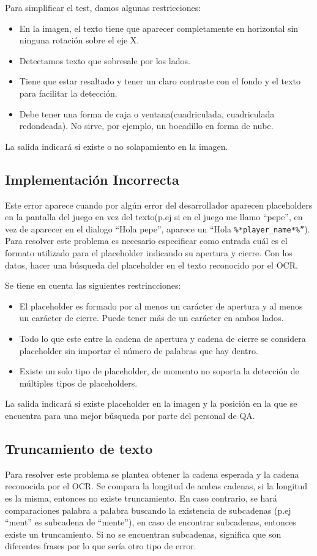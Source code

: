Para simplificar el test, damos algunas restricciones: 
\begin{itemize}
	\item En la imagen, el texto tiene que aparecer completamente en horizontal sin ninguna rotación sobre el eje X.
	\item Detectamos texto que sobresale por los lados.
	\item Tiene que estar resaltado y tener un claro contraste con el fondo y el texto para facilitar la detección.
	\item Debe tener una forma de caja o ventana(cuadriculada, cuadriculada redondeada). No sirve, por ejemplo, un bocadillo en forma de nube.
\end{itemize} 
La salida indicará si existe o no solapamiento en la imagen.

\subsection{Implementación Incorrecta}
\label{test:placeholder}
Este error aparece cuando por algún error del desarrollador aparecen placeholders en la pantalla del juego en vez del texto(p.ej si en el juego me llamo ``pepe'', en vez de aparecer en el dialogo ``Hola pepe'', aparece un ``Hola      \texttt{\%*player\_name*\%''}).
Para resolver este problema es necesario especificar como entrada cuál es el formato utilizado para el placeholder indicando su apertura y cierre. Con los datos, hacer una búsqueda del placeholder en el texto reconocido por el OCR.

Se tiene en cuenta las siguientes restrincciones:
\begin{itemize}
	\item El placeholder es formado por al menos un carácter de apertura y al menos un carácter de cierre. Puede tener más de un carácter en ambos lados.
	\item Todo lo que este entre la cadena de apertura y cadena de cierre se considera placeholder sin importar el número de palabras que hay dentro.
	\item Existe un solo tipo de placeholder, de momento no soporta la detección de múltiples tipos de placeholders.
\end{itemize}
La salida indicará si existe placeholder en la imagen y la posición en la que se encuentra para una mejor búsqueda por parte del personal de QA.
\subsection{Truncamiento de texto}
\label{test:trunc}
Para resolver este problema se plantea obtener la cadena esperada y la cadena reconocida por el OCR. Se compara la longitud de ambas cadenas, si la longitud es la misma, entonces no existe truncamiento. En caso contrario, se hará comparaciones palabra a palabra buscando la existencia de subcadenas (p.ej ``ment'' es subcadena de ``mente''), en caso de encontrar subcadenas, entonces existe un truncamiento. Si no se encuentran subcadenas, significa que son diferentes frases por lo que sería otro tipo de error.

